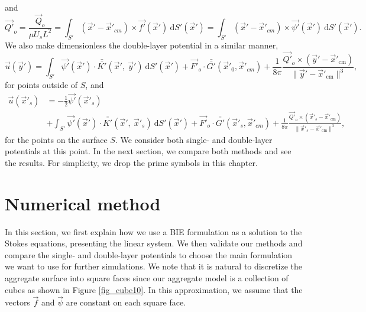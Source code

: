  and
 \begin{equation}
 \vec{Q'}_o = \frac{\vec{Q}_o}{\mu U_s L^2}
 = \int_{S'} (\vec{x}' - \vec{x}'_{cm}) \times \vec{f'}(\vec{x}')  \ \text{d}S' (\vec{x}')
 =  \int_{S'} (\vec{x}' - \vec{x}'_{cm}) \times \vec{\psi'}(\vec{x}') \ \text{d}S'(\vec{x}').
 \label{eq_total_Torque_noD}
 \end{equation}
 We also make dimensionless the double-layer potential in a similar manner, 
 \begin{equation}
 \vec{u}(\vec{y}') = \int_{S'}
 \vec{\psi'}(\vec{x}') \cdot  \bar{\bar{K'}}(\vec{x}', \ \vec{y}')  \ \text{d}S' (\vec{x}') + \vec{F'}_o \cdot \bar{\bar{G'}}(\vec{x}'_{0},\vec{x}'_{cm})
 +\frac{1}{8 \pi} \frac{\vec{Q'}_o \times
 (\vec{y}'   - \vec{x}'_{\text{cm}} ) }{\| \vec{y}'   - \vec{x}'_{\text{cm}} \|^3 },
  \label{eq_BI_DL_noD}
 \end{equation}
 for points outside of $S$, and
 \begin{align}
 \vec{u}(\vec{x}'_s) 
 & =  -\frac{1}{2}\vec{\psi'}(\vec{x}'_s)
 \nonumber  \\
&+  \int_{S'}
 \vec{\psi'}(\vec{x}') \cdot  \bar{\bar{K'}}(\vec{x}', \ \vec{x}'_s)  \ \text{d}S' (\vec{x}') + \vec{F'}_o \cdot \bar{\bar{G'}}(\vec{x}'_{s},\vec{x}'_{cm})
 +\frac{1}{8 \pi} \frac{\vec{Q'}_o \times
 (\vec{x}'_s   - \vec{x}'_{\text{cm}} ) }{\| \vec{x}'_s   - \vec{x}'_{\text{cm}} \|^3 },
  \label{eq_BI_DL_jump_noD}
 \end{align}
 for the points on the surface $S$.
We consider both single- and double-layer potentials at this point. In the next section, we compare both methods and see the results. For simplicity, we drop the prime symbols in this chapter.
\section{Numerical method}
In this section, we first explain how we use a BIE formulation as a solution to the Stokes equations, presenting the linear system. We then validate our methods and compare the single- and double-layer potentials to choose the main formulation we want to use for further simulations. We note that it is natural to discretize the aggregate surface into square faces since our aggregate model is a collection of cubes as shown in Figure \ref{fig_cube10}. In this approximation, we assume that the vectors $\vec{f}$ and $\vec{\psi}$ are constant on each square face.
